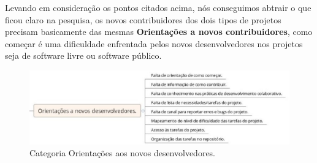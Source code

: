 Levando em consideração os pontos citados acima, nós conseguimos abtrair o que
ficou claro na pesquisa, os novos contribuidores dos dois tipos de projetos precisam
basicamente das mesmas \textbf{Orientações a novos contribuidores}, como começar é 
uma dificuldade enfrentada pelos novos desenvolvedores nos projetos seja de 
software livre ou software público. 

\begin{figure}[h]
	\centering
	\label{fig:orientacoes}
		\includegraphics[keepaspectratio=true,scale=0.5]{figuras/orientacoes.eps}
	\caption{Categoria Orientações aos novos desenvolvedores.}
\end{figure}

